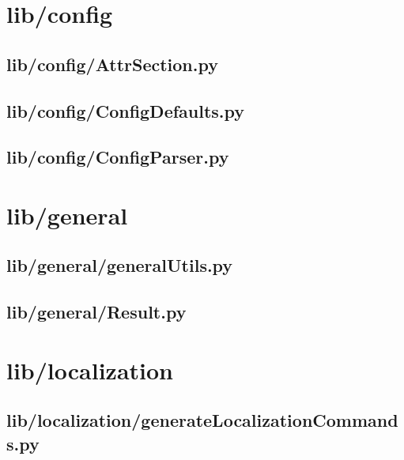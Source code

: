 \section{lib/config}

\subsection*{lib/config/AttrSection.py}
\label{ap:AttrSection}

\subsection*{lib/config/ConfigDefaults.py}
\label{ap:ConfigDefaults}

\subsection*{lib/config/ConfigParser.py}
\label{ap:ConfigParser}
\section{lib/general}

\subsection*{lib/general/generalUtils.py}
\label{ap:generalUtils}

\subsection*{lib/general/Result.py}
\label{ap:Result}
\section{lib/localization}

\subsection*{lib/localization/generateLocalizationCommands.py}
\label{ap:generateLocalizationCommands}

